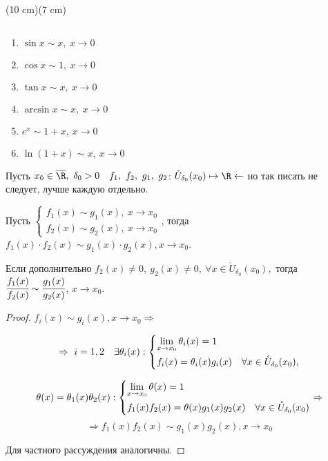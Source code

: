 \sidefig(10 cm)(7 cm)
{
\begin{flushleft}

\end{flushleft}
}
{
\normalsize
\begin{examples} $\ $
\begin{enumerate}
    \item $\sin x \sim x, \ x\to 0$
    \item $\cos x \sim 1,\ x\to 0$
    \item $\tan x \sim x,\ x \to 0$
    \item $\arcsin x \sim x,\ x \to 0$
    \item $e^{x} \sim 1+x,\ x\to 0$
    \item $\ln(1+x) \sim x,\ x\to 0$
\end{enumerate}
\end{examples}
}
    


\begin{lemma}
    Пусть $x_{0} \in \overline{\R}, \ \delta_{0} > 0 \quad f_{1},\ f_{2},\ g_{1},\ g_{2}$: $\mathring{U}_{\delta_{0}}(x_{0}) \mapsto \R \leftarrow$ но так писать не следует, лучше каждую отдельно.

    Пусть $\left\{
    \begin{gathered}
        f_{1}(x) \sim g_{1}(x),\  x\to x_{0} \\
        f_{2}(x) \sim g_{2}(x),\  x\to x_{0}
    \end{gathered} \right.$, тогда $f_{1}(x) \cdot f_{2} (x) \sim g_{1}(x) \cdot g_{2} (x), x\to x_{0}$.

    Если дополнительно $f_{2}(x) \neq 0,\  g_{2}(x) \neq 0, \ \forall x\in \mathring{U}_{\delta_{0}}(x_{0}),$ тогда $\cfrac{f_{1}(x)}{f_{2}(x)} \sim \cfrac{g_{1}(x)}{g_{2}(x)}$, $x\to x_{0}$.
\end{lemma}
\begin{proof}
    $f_{i}(x) \sim g_{i}(x), x\to x_{0} \Rightarrow $
    
    $$
    \Rightarrow \ i =1, 2\quad  \exists \theta_{i}(x): \left\{
    \begin{gathered}
        \lim\limits_{x\to x_{0}} \theta_{i}(x) = 1 \hfill \\
        f_{i}(x) = \theta_{i}(x) g_{i}(x) \quad \forall x\in \mathring{U}_{\delta_{0}}(x_{0}), 
    \end{gathered} \right.$$

    $$
    \theta(x) = \theta_{1}(x)\theta_{2}(x): 
    \left\{ \begin{gathered}
        \lim\limits_{x \to x_{0}} \theta(x)= 1 \hfill \\
        f_{1}(x)f_{2}(x) = \theta(x) g_{1}(x)g_{2}(x) \quad \forall x\in \mathring{U}_{\delta_{0}}(x_{0})\hfill
        \end{gathered} \right.
        \Rightarrow
    $$
    $$
    \Rightarrow
        f_{1}(x)f_{2}(x)\sim g_{1}(x)g_{2}(x), x\to x_{0}
    $$

    Для частного рассуждения аналогичны.
\end{proof}

